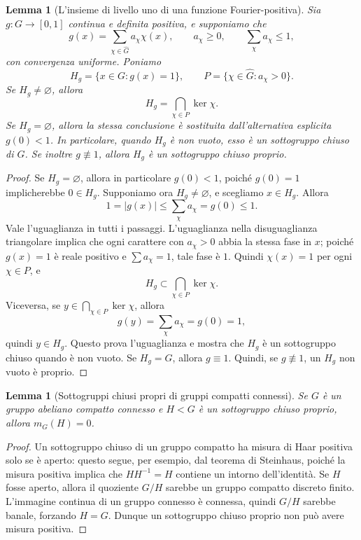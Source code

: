 \documentclass[11pt]{article}
\numberwithin{equation}{section}
\newtheorem{lemma}[theorem]{Lemma}
\newcommand{\1}{\mathbf 1}
\begin{document}
\begin{lemma}[L'insieme di livello uno di una funzione Fourier-positiva]
\label{lem:one-set}
Sia \(g:G\to[0,1]\) continua e definita positiva, e supponiamo che
\[
        g(x)=\sum_{\chi\in\widehat G} a_\chi\chi(x),
        \qquad
        a_\chi\ge0,
        \qquad
        \sum_\chi a_\chi\le1,
\]
con convergenza uniforme. Poniamo
\[
        H_g=\{x\in G:g(x)=1\},
        \qquad
        P=\{\chi\in\widehat G:a_\chi>0\}.
\]
Se \(H_g\ne\varnothing\), allora
\[
        H_g=\bigcap_{\chi\in P}\ker\chi.
\]
Se \(H_g=\varnothing\), allora la stessa conclusione è sostituita dall'alternativa esplicita \(g(0)<1\). In particolare, quando \(H_g\) è non vuoto, esso è un sottogruppo chiuso di \(G\). Se inoltre \(g\not\equiv1\), allora \(H_g\) è un sottogruppo chiuso proprio.
\end{lemma}

\begin{proof}
Se \(H_g=\varnothing\), allora in particolare \(g(0)<1\), poiché \(g(0)=1\) implicherebbe \(0\in H_g\). Supponiamo ora \(H_g\ne\varnothing\), e scegliamo \(x\in H_g\). Allora
\[
        1=|g(x)|
        \le
        \sum_\chi a_\chi
        =
        g(0)
        \le1.
\]
Vale l'uguaglianza in tutti i passaggi. L'uguaglianza nella disuguaglianza triangolare implica che ogni carattere con \(a_\chi>0\) abbia la stessa fase in \(x\); poiché \(g(x)=1\) è reale positivo e \(\sum a_\chi=1\), tale fase è \(1\). Quindi \(\chi(x)=1\) per ogni \(\chi\in P\), e
\[
        H_g\subset\bigcap_{\chi\in P}\ker\chi.
\]
Viceversa, se \(y\in\bigcap_{\chi\in P}\ker\chi\), allora
\[
        g(y)=\sum_\chi a_\chi=g(0)=1,
\]
quindi \(y\in H_g\). Questo prova l'uguaglianza e mostra che \(H_g\) è un sottogruppo chiuso quando è non vuoto. Se \(H_g=G\), allora \(g\equiv1\). Quindi, se \(g\not\equiv1\), un \(H_g\) non vuoto è proprio.
\end{proof}

\begin{lemma}[Sottogruppi chiusi propri di gruppi compatti connessi]
\label{lem:proper-subgroup-null}
Se \(G\) è un gruppo abeliano compatto connesso e \(H<G\) è un sottogruppo chiuso proprio, allora \(m_G(H)=0\).
\end{lemma}

\begin{proof}
Un sottogruppo chiuso di un gruppo compatto ha misura di Haar positiva solo se è aperto: questo segue, per esempio, dal teorema di Steinhaus, poiché la misura positiva implica che \(HH^{-1}=H\) contiene un intorno dell'identità. Se \(H\) fosse aperto, allora il quoziente \(G/H\) sarebbe un gruppo compatto discreto finito. L'immagine continua di un gruppo connesso è connessa, quindi \(G/H\) sarebbe banale, forzando \(H=G\). Dunque un sottogruppo chiuso proprio non può avere misura positiva.
\end{proof}
\end{document}
